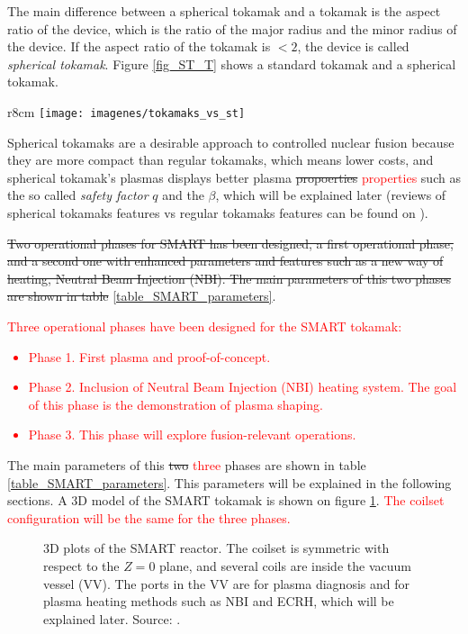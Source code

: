 \documentclass[a4paper,12pt,oneside]{book}
\begin{document}
The main difference between a spherical tokamak and a tokamak is the aspect ratio of the device, which is the ratio of the major radius and the minor radius of the device. If the aspect ratio of the tokamak is $< 2$, the device is called \textit{spherical tokamak}. Figure \ref{fig_ST_T} shows a standard tokamak and a spherical tokamak.

\begin{wrapfigure}{r}{8cm}
\texttt{[image: imagenes/tokamaks\_vs\_st]}
\caption{Tokamaks and spherical tokamaks. Source: \cite{ST_vs_T}.}
\label{fig_ST_T}
\end{wrapfigure}

Spherical tokamaks are a desirable approach to controlled nuclear fusion because they are more compact than regular tokamaks, which means lower costs, and spherical tokamak's plasmas displays better plasma \st{propoerties} \textcolor{red}{properties} such as the so called  \textit{safety factor} $q$ and the $\beta$, which will be explained later (reviews of spherical tokamaks features vs regular tokamaks features can be found on \cite{ST_vs_T,Peng_1986}).


\st{Two operational phases for SMART has been designed, a first operational phase, and a second one with enhanced parameters and features such as a new way of heating, Neutral Beam Injection (NBI). The main parameters of this two phases are shown in table } \ref{table_SMART_parameters}.

\textcolor{red}{Three operational phases have been designed for the SMART tokamak:
%
\begin{itemize}
\item Phase 1. First plasma and proof-of-concept.
\item Phase 2. Inclusion of Neutral Beam Injection (NBI) heating system. The goal of this phase is the demonstration of plasma shaping.
\item Phase 3. This phase will explore fusion-relevant operations.
\end{itemize} }
The main parameters of this \st{two} \textcolor{red}{three} phases are shown in table \ref{table_SMART_parameters}. This parameters will be explained in the following sections. A 3D model of the SMART tokamak is shown on figure \ref{fig_SMART_3D_Alessio}. \textcolor{red}{The coilset configuration will be the same for the three phases.}


\begin{figure}[htbp]
\centering
{}
\hfill
{}
\caption{3D plots of the SMART reactor. The coilset is symmetric with respect to the $Z=0$ plane, and several coils are inside the vacuum vessel (VV). The ports in the VV are for plasma diagnosis and for plasma heating methods such as NBI and ECRH, which will be explained later. Source: \cite{Alessio}.}
\label{fig_SMART_3D_Alessio}
\end{figure}
\end{document}
